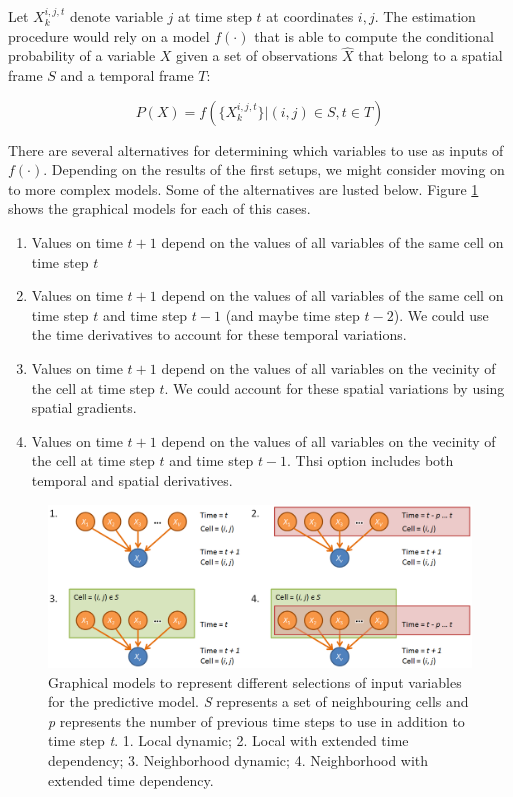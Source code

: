 \documentclass{article}
\begin{document}
Let $X_k^{i,j,t}$ denote variable $j$ at time step $t$ at coordinates $i, j$.
The estimation procedure would rely on a model $f(\cdot)$ that is able to
compute the conditional probability of a variable $X$ given a set of observations
$\hat{X}$ that belong to a spatial frame $S$ and a temporal frame $T$:

\begin{equation}
\label{eq:condProb}
P(X) = f(\{X_k^{i,j,t}\} | (i,j) \in S, t \in T)
\end{equation}

There are several alternatives for determining which variables to use as inputs
of $f(\cdot)$. Depending on the results of the first setups, we might consider
moving on to more complex models. Some of the alternatives are lusted below.
Figure \ref{plate_models} shows the graphical models for each of this cases.

\begin{enumerate}
\item Values on time $t + 1$ depend on the values of all variables of the same
cell on time step $t$
\item Values on time $t + 1$ depend on the values of all variables of the same
cell on time step $t$ and time step $t - 1$ (and maybe time step $t- 2$). We
could use the time derivatives to account for these temporal variations.
\item Values on time $t + 1$ depend on the values of all variables on the
vecinity of the cell at time step $t$. We could account for these spatial
variations by using spatial gradients.
\item Values on time $t + 1$ depend on the values of all variables on the
vecinity of the cell at time step $t$ and time step $t -1$. Thsi option includes
both temporal and spatial derivatives.
\end{enumerate}

\begin{figure}
\includegraphics[width=\linewidth]{plate_models.png}
\caption{Graphical models to represent different
selections of input variables for the predictive model. \textit{S} represents
a set of neighbouring cells and \textit{p} represents the number of previous
time steps to use in addition to time step \textit{t}. 1.
Local dynamic; 2. Local with extended time dependency; 3.
Neighborhood dynamic; 4. Neighborhood with extended time
dependency.}\label{plate_models}
\end{figure}
\end{document}

